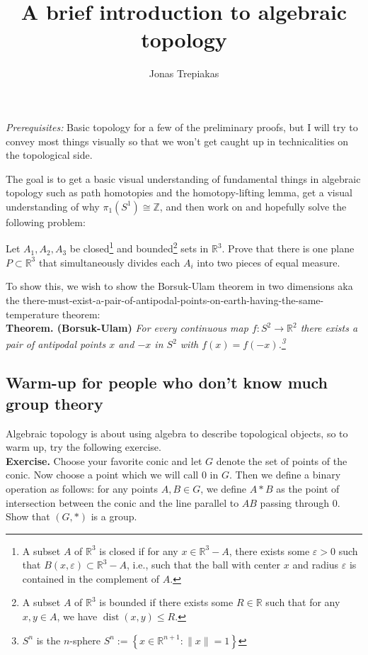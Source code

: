 \documentclass[a4paper]{article}
\title{A brief introduction to algebraic topology}
\date{}
\author{Jonas Trepiakas}
\theoremstyle{plain}%
\theoremstyle{definition}
\theoremstyle{remark}
\DeclareMathOperator{\dist}{dist}
\begin{document}
\maketitle

\textit{Prerequisites:} Basic topology for a few of the preliminary proofs, but
I will try to convey most things visually so that we won't get caught up in
technicalities on the topological side.\\
\linebreak


The goal is to get a basic visual understanding of fundamental things in
algebraic topology such as path homotopies and the homotopy-lifting lemma, get
a visual understanding of why $\pi_1 (S^{1}) \cong \mathbb{Z}$, and then work
on
and hopefully solve the following problem:
\begin{center}
    Let $A_1, A_2, A_3$ be closed\footnote{A subset $A$ of
    $\mathbb{R}^3$ is closed if for any
$x \in \mathbb{R}^3 - A$, there exists some $\varepsilon >0$ such that
$B(x,\varepsilon) \subset \mathbb{R}^3 - A$, i.e., such that the ball with
center $x$ and radius $\varepsilon$ is contained in the complement of
$A$.} and bounded\footnote{A subset
    $A$ of $\mathbb{R}^3$ is bounded if there exists some
    $R \in \mathbb{R}$ such that
for any $x,y \in A$, we have 
$\dist(x,y) \le R$.} sets in $\mathbb{R}^3$. Prove that there is one plane
$P \subset \mathbb{R}^3$ that simultaneously divides each
$A_{i}$ into two pieces of equal measure.
\end{center}


To show this, we wish to show the Borsuk-Ulam theorem in two dimensions aka
the
there-must-exist-a-pair-of-antipodal-points-on-earth-having-the-same-temperature
theorem:\\
\linebreak
\textbf{Theorem. (Borsuk-Ulam)}\textit{
    For every continuous map $f  \colon S^2 \to \mathbb{R}^2$ there exists
    a pair of antipodal points $x$ and $-x$ in $S^2$ with
$f(x) = f(-x)$.\footnote{$S^{n}$ is the $n$-sphere $S^{n} := 
\left\{ x \in \mathbb{R}^{n+1}  \colon \|x \|=1 \right\} $}}
\subsection*{Warm-up for people who don't know much group theory}
    Algebraic topology is about using algebra to describe topological objects,
    so to warm up, try the following exercise.\\
    \linebreak
\textbf{Exercise.} Choose your favorite conic and let $G$ denote the set of
points of the conic. Now choose a point which we will call $0$ in $G$. Then we
define a binary operation as follows: for any points $A,B \in G$, we define $A
* B$ as the point of intersection between the conic and the line parallel to
$AB$ passing through $0$. Show that $(G,*)$ is a group.
\end{document}
